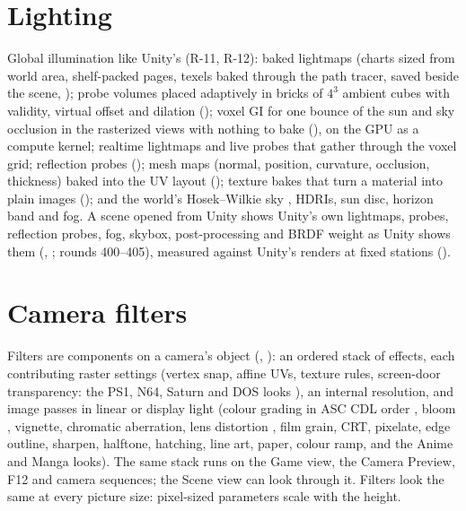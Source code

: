 \section{Lighting}
Global illumination like Unity's (R-11, R-12): baked lightmaps (charts sized from world area, shelf-packed pages,
texels baked through the path tracer, saved beside the scene, ); probe volumes placed adaptively in bricks
of $4^3$ ambient cubes \cite{McTaggart2004} with validity, virtual offset and dilation (); voxel GI
\cite{Thiedemann2011Voxel, Amanatides1987Fast, Dachsbacher2005, Hammersley1960} for one bounce of the sun and sky
occlusion in the rasterized views with nothing to bake (), on the GPU as a compute kernel; realtime lightmaps
and live probes that gather through the voxel grid; reflection probes (); mesh maps (normal, position,
curvature, occlusion, thickness) baked into the UV layout (); texture bakes that turn a material into plain
images (); and the world's Hosek--Wilkie sky \cite{Hosek2012Analytic}, HDRIs, sun disc, horizon band and fog.
A scene opened from Unity shows Unity's own lightmaps, probes, reflection probes, fog, skybox, post-processing and
BRDF weight as Unity shows them (, ; rounds 400--405), measured against Unity's renders at fixed
stations ().

\section{Camera filters}
Filters are components on a camera's object (, ): an ordered stack of effects, each contributing
raster settings (vertex snap, affine UVs, texture rules, screen-door transparency: the PS1, N64, Saturn and DOS looks
\cite{psxspx}), an internal resolution, and image passes in linear or display light (colour grading in ASC CDL order
\cite{ASCCDL}, bloom \cite{Jimenez2014}, vignette, chromatic aberration, lens distortion \cite{Brown1966}, film grain,
CRT, pixelate, edge outline, sharpen, halftone, hatching, line art, paper, colour ramp, and the Anime and Manga
looks). The same stack runs on the Game view, the Camera Preview, F12 and camera sequences; the Scene view can look
through it. Filters look the same at every picture size: pixel-sized parameters scale with the height.
